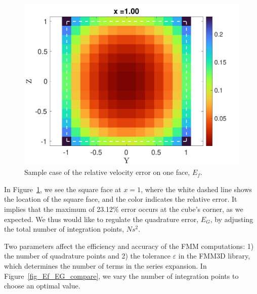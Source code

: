 \begin{figure}[h]
	\begin{center}
		\includegraphics[scale=0.3]{./figures/fig_corner_err}
	\caption{Sample case of the relative velocity error on one face, $E_f$.}
	\label{fig_corner_err}
\end{center}
\end{figure}
In Figure~\ref{fig_corner_err}, we see the square face at $x = 1$, where the white dashed line shows the location of the square face, and the color indicates the relative error. It implies that the maximum of 23.12$\%$ error occurs at the cube's corner, as we expected. We thus would like to regulate the quadrature error, $E_G$, by adjusting the total number of integration points, $Ns^2$.
\par
Two parameters affect the efficiency and accuracy of the FMM computations: 1) the number of quadrature points and 2) the tolerance $\varepsilon$ in the FMM3D library, which determines the number of terms in the series expansion.
In Figure~\ref{fig_Ef_EG_compare}, we vary the number of integration points to choose an optimal value. 
